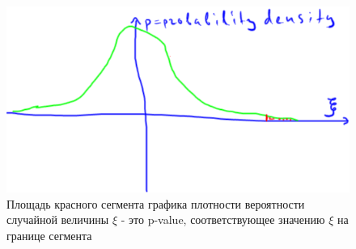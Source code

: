 \documentclass{book}
\begin{document}
\begin{figure}
    \centering
    \includegraphics[scale=.5]{img/p-value.png}
    \caption{Площадь красного сегмента графика плотности вероятности случайной величины $\xi$ - это p-value, соответствующее значению $\xi$ на границе сегмента}
    \label{pval}
\end{figure}



\end{document}
